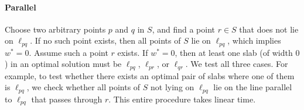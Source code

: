 \documentclass[english,a4paper, cleveref, autoref, thm-restate, nolineno]{socg-lipics-v2021}
\theoremstyle{star}
\theoremstyle{claimstar}
\begin{document}
\paragraph*{Parallel}
Choose two arbitrary points $p$ and $q$ in $S$, and find a point $r \in S$ that does not lie on $\ell_{pq}$. 
If no such point exists, then all points of $S$ lie on $\ell_{pq}$, which implies $w^* = 0$.
Assume such a point $r$ exists. 
If $w^* = 0$, then at least one slab (of width $0$) in an optimal solution must be $\ell_{pq}$, $\ell_{pr}$, or $\ell_{qr}$.
We test all three cases. 
For example, to test whether there exists an optimal pair of slabs where one of them is $\ell_{pq}$, we check whether all points of $S$ not lying on $\ell_{pq}$ lie on the line parallel to $\ell_{pq}$ that passes through $r$. 
This entire procedure takes linear time.
\end{document}
